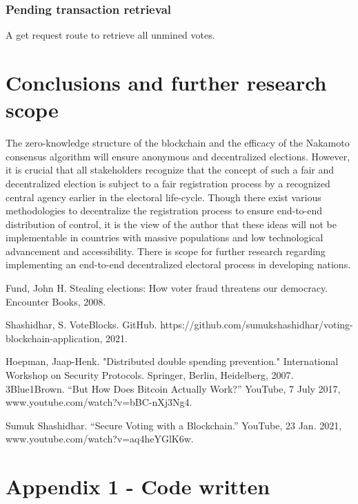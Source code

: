 \documentclass{article}
\begin{document}
    \subsubsection{Pending transaction retrieval}
    A get request route to retrieve all unmined votes.

    \section{Conclusions and further research scope}
    The zero-knowledge structure of the blockchain and the efficacy of the Nakamoto consensus algorithm will ensure anonymous and decentralized elections. However, it is crucial that all stakeholders recognize that the concept of such a fair and decentralized election is subject to a fair registration process by a recognized central agency earlier in the electoral life-cycle. Though there exist various methodologies to decentralize the registration process to ensure end-to-end distribution of control, it is the view of the author that these ideas will not be implementable in countries with massive populations and low technological advancement and accessibility. There is scope for further research regarding implementing an end-to-end decentralized electoral process in developing nations.

    \begin{thebibliography}{9}
        Fund, John H. Stealing elections: How voter fraud threatens our democracy. Encounter Books, 2008.
        
        Shashidhar, S. VoteBlocks. GitHub. https://github.com/sumukshashidhar/voting-blockchain-application, 2021.
        
        Hoepman, Jaap-Henk. "Distributed double spending prevention." International Workshop on Security Protocols. Springer, Berlin, Heidelberg, 2007.
        3Blue1Brown. “But How Does Bitcoin Actually Work?” YouTube, 7 July 2017, www.youtube.com/watch?v=bBC-nXj3Ng4.

        Sumuk Shashidhar. “Secure Voting with a Blockchain.” YouTube, 23 Jan. 2021, www.youtube.com/watch?v=aq4heYGlK6w.
    \end{thebibliography}
    \appendix
    \appendixpage
    \addappheadtotoc
    \section*{Appendix 1 - Code written}
    \begin{lstlisting}[language=Python]
    \end{lstlisting}
\end{document}
